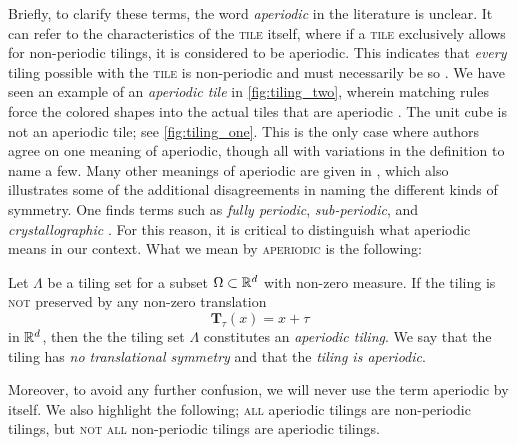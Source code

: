 \documentclass[../thesis.tex]{subfiles}
\begin{document}
Briefly, to clarify these terms, the word \emph{aperiodic} in the literature is unclear. It can refer to the characteristics of the \textsc{tile} itself, where if a \textsc{tile} exclusively allows for non-periodic tilings, it is considered to be aperiodic. This indicates that \emph{every} tiling possible with the \textsc{tile} is non-periodic and must necessarily be so \cite[p. 520]{grunbaumTilingsPatterns1987}. We have seen an example of an \emph{aperiodic tile} in \cref{fig:tiling_two}, wherein matching rules force the colored shapes into the actual tiles that are aperiodic \cite{penrosePentaplexityClassNonPeriodic1979}. The unit cube is not an aperiodic tile; see \cref{fig:tiling_one}. This is the only case where authors agree on one meaning of aperiodic, though all with variations in the definition \cite[p. 520, p.154, p.11]{grunbaumTilingsPatterns1987,baakeAperiodicOrder2013,kolountzakisTilingsTranslation2010} to name a few. Many other meanings of aperiodic are given in \cite{baakeAperiodicOrder2013}, which also illustrates some of the additional disagreements in naming the different kinds of symmetry. One finds terms such as \emph{fully periodic}, \emph{sub-periodic}, and \emph{crystallographic} \cite[p. 45]{baakeAperiodicOrder2013}. For this reason, it is critical to distinguish what aperiodic means in our context. What we mean by \textsc{aperiodic} is the following:  %
\begin{definition}
    Let $\Lambda$ be a tiling set for a subset $\Omega\subset \mathbb{R}^d$ with non-zero measure. If the tiling is \textsc{not} preserved by any non-zero translation 
    \begin{equation*}
        \mathbf{T}_\tau (x) = x+\tau 
    \end{equation*}
    in $\mathbb{R}^d$, then the the tiling set $\Lambda$ constitutes an \emph{aperiodic tiling}. We say that the tiling has \emph{no translational symmetry} and that the \emph{tiling is aperiodic}.
\end{definition}
Moreover, to avoid any further confusion, we will never use the term aperiodic by itself. We also highlight the following; \textsc{all} aperiodic tilings are non-periodic tilings, but \textsc{not all} non-periodic tilings are aperiodic tilings.
\end{document}
